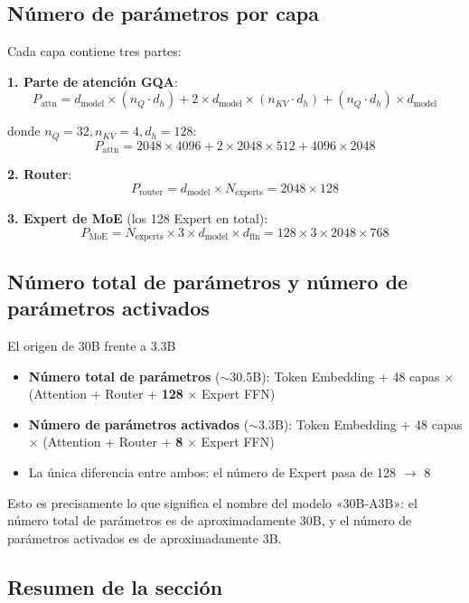 \documentclass[a4paper]{article}
\begin{document}
\subsection{Número de parámetros por capa}

Cada capa contiene tres partes:

\textbf{1. Parte de atención GQA}:
$$
P_{\text{attn}} = d_{\text{model}} \times (n_Q \cdot d_h) + 2 \times d_{\text{model}} \times (n_{KV} \cdot d_h) + (n_Q \cdot d_h) \times d_{\text{model}}
$$

donde $n_Q = 32, n_{KV} = 4, d_h = 128$:
$$
P_{\text{attn}} = 2048 \times 4096 + 2 \times 2048 \times 512 + 4096 \times 2048
$$

\textbf{2. Router}:
$$
P_{\text{router}} = d_{\text{model}} \times N_{\text{experts}} = 2048 \times 128
$$

\textbf{3. Expert de MoE} (los 128 Expert en total):
$$
P_{\text{MoE}} = N_{\text{experts}} \times 3 \times d_{\text{model}} \times d_{\text{ffn}} = 128 \times 3 \times 2048 \times 768
$$

\subsection{Número total de parámetros y número de parámetros activados}

\begin{importantbox}{El origen de 30B frente a 3.3B}
\begin{itemize}
  \item \textbf{Número total de parámetros} ($\sim$30.5B): Token Embedding + 48 capas $\times$ (Attention + Router + \textbf{128} $\times$ Expert FFN)
  \item \textbf{Número de parámetros activados} ($\sim$3.3B): Token Embedding + 48 capas $\times$ (Attention + Router + \textbf{8} $\times$ Expert FFN)
  \item La única diferencia entre ambos: el número de Expert pasa de 128 $\to$ 8
\end{itemize}
\end{importantbox}

Esto es precisamente lo que significa el nombre del modelo «30B-A3B»: el número total de parámetros es de aproximadamente 30B, y el número de parámetros activados es de aproximadamente 3B.

\subsection{Resumen de la sección}
\end{document}
